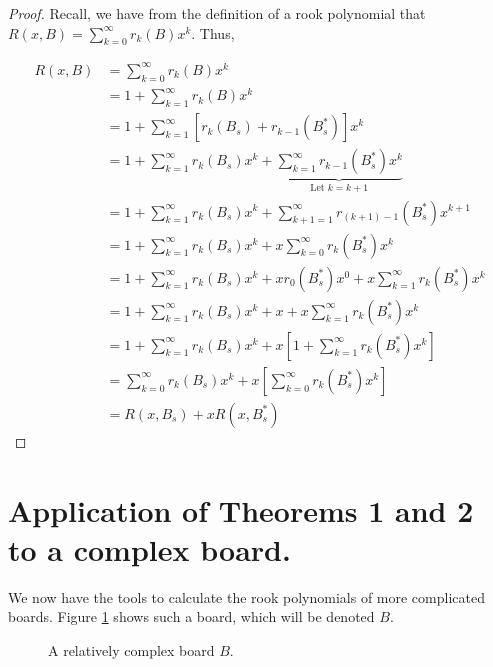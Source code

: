 \documentclass{article}
\newcommand{\w}{0.5}
\newcommand{\ww}{0.25}
\newcommand{\drawgrid}[2]{\draw[step=\w cm,black,thin] (0,0) grid (#1*\w,#2*\w);}
\newcommand{\labelcol}[2]{\draw (#1*\w cm - \ww cm, 0 cm) node[anchor=north] {#2};}
\newcommand{\labelrow}[2]{\draw (0 cm, #1*\w cm - \ww cm) node[anchor=east] {#2};}
\newcommand{\shadesquare}[2]{\filldraw[fill=gray!40!white, draw=black] (#1*\w - \w,#2*\w - \w) rectangle (#1*\w,#2*\w);}
\begin{document}
\begin{proof}
    Recall, we have from the definition of a rook polynomial that $R(x,B) = \sum_{k=0}^{\infty} r_k(B) x^k$. Thus,
    
    \begin{align*}
        R(x,B) &= \sum_{k=0}^{\infty} r_k(B) x^k \\
        &= 1 + \sum_{k=1}^{\infty} r_k(B) x^k \\
        &= 1 + \sum_{k=1}^{\infty} \left[ r_k(B_s) + r_{k-1}(B_{s}^*) \right] x^k \\ 
        &= 1 + \sum_{k=1}^{\infty} r_k(B_s) x^k + \underbrace{\sum_{k=1}^{\infty} r_{k-1}(B_{s}^*) x^k}_{\text{Let $k=k+1$}} \\
        &= 1 +\sum_{k=1}^{\infty} r_k(B_s) x^k + \sum_{k+1=1}^{\infty} r_{(k+1)-1}(B_{s}^*) x^{k+1} \\
        &= 1 + \sum_{k=1}^{\infty} r_k(B_s) x^k + x\sum_{k=0}^{\infty} r_{k}(B_{s}^*) x^{k} \\
        &= 1 + \sum_{k=1}^{\infty} r_k(B_s) x^k + xr_{0}(B_s^*) x^{0} + x\sum_{k=1}^{\infty} r_{k}(B_{s}^*) x^{k} \\
        &= 1 + \sum_{k=1}^{\infty} r_k(B_s) x^k + x + x\sum_{k=1}^{\infty} r_{k}(B_{s}^*) x^{k} \\
        &= 1 + \sum_{k=1}^{\infty} r_k(B_s) x^k + x \left[1 + \sum_{k=1}^{\infty} r_{k}(B_{s}^*) x^{k} \right] \\
        &= \sum_{k=0}^{\infty} r_k(B_s) x^k + x \left[ \sum_{k=0}^{\infty} r_{k}(B_{s}^*) x^{k} \right] \\
        &= R(x,B_s) + xR(x,B_s^*)
    \end{align*}
    
    
\end{proof}

\section{Application of Theorems 1 and 2 to a complex board.} \label{application}

We now have the tools to calculate the rook polynomials of more complicated boards. Figure \ref{scattered} shows such a board, which will be denoted $B$.

\begin{figure}[!h]
    \centering
    \caption{A relatively complex board $B$.}
    \label{scattered}
\end{figure}
\end{document}
